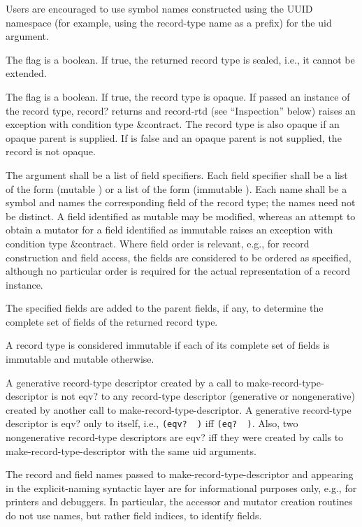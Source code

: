 \begin{entry}{%
}
\begin{note}   
  Users are encouraged to use symbol names
  constructed using the UUID namespace (for example, using the
  record-type name as a prefix) for the uid argument.
\end{note}

The  flag is a boolean. If true, the returned record type
is sealed, i.e., it cannot be extended.

The  flag is a boolean. If true, the record type
is opaque.
If passed an instance of the record type,
{\cf record?} returns
\schfalse{} and {\cf record-rtd} (see ``Inspection'' below) raises
an exception with condition type {\cf\&contract}.
The record type is also opaque if an opaque parent is
supplied.  If  is false and an opaque parent is not
supplied, the record is not opaque.

The  argument shall be a list of field specifiers. Each
field specifier shall be a list of the form {\cf (mutable )}
or a list of the form {\cf (immutable )}.
Each name shall be a symbol and names the corresponding field of the record
type; the names need not be distinct.  A field identified as mutable may
be modified, whereas an attempt to obtain a mutator for a field identified
as immutable raises an exception with condition type {\cf\&contract}.
Where field order is relevant, e.g., for record construction and field
access, the fields are considered to be ordered as specified, although
no particular order is required for the actual representation of a
record instance.

The specified fields are added to the parent fields, if any, to determine
the complete set of fields of the returned record type.

A record type is considered immutable if each of its complete set of
fields is immutable and mutable otherwise.

A generative record-type descriptor created by a call to {\cf
  make-record-type-descriptor} is not {\cf eqv?} to any record-type
descriptor (generative or nongenerative) created by another call to
{\cf make-record-type-descriptor}. A generative record-type descriptor
is {\cf eqv?}  only to itself, i.e., {\tt (eqv?~ )} iff
{\tt (eq?~ )}.
Also, two nongenerative record-type descriptors are {\cf eqv?} iff they were
created by calls to {\cf make-record-type-descriptor} with the same
uid arguments.

\begin{rationale}
  The record and field names passed to
  {\cf make-record-type-descriptor} and appearing in the explicit-naming
  syntactic layer are for informational purposes only, e.g., for
  printers and debuggers.
  In particular, the accessor and mutator creation routines do not use
  names, but rather field indices, to identify fields.
  

\end{rationale}
\end{entry}
